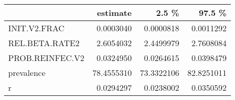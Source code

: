 
\begin{tabular}{l|r|r|r}
\hline
  & estimate & 2.5 \% & 97.5 \%\\
\hline
INIT.V2.FRAC & 0.0003040 & 0.0000818 & 0.0011292\\
\hline
REL.BETA.RATE2 & 2.6054032 & 2.4499979 & 2.7608084\\
\hline
PROB.REINFEC.V2 & 0.0324950 & 0.0264615 & 0.0398479\\
\hline
prevalence & 78.4555310 & 73.3322106 & 82.8251011\\
\hline
r & 0.0294297 & 0.0238002 & 0.0350592\\
\hline
\end{tabular}